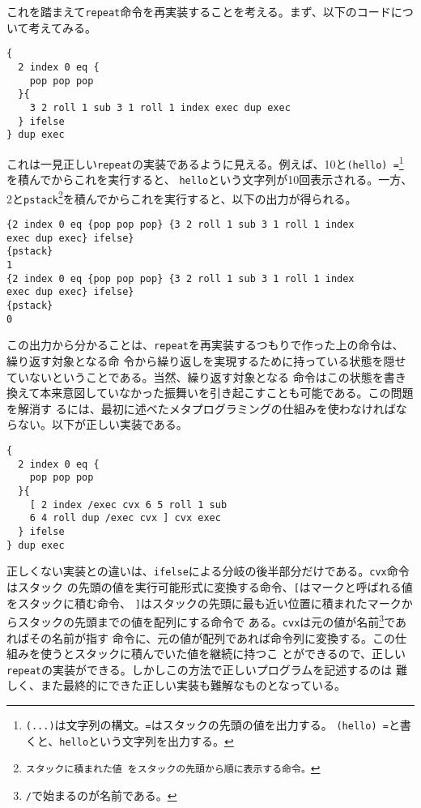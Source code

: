 \documentclass[a4paper, 10pt, twocolumn, titlepage]{ujarticle}
\renewcommand{\{}{\symbol{"7B}}
\renewcommand{\}}{\symbol{"7D}}
\begin{document}
これを踏まえて\texttt{repeat}命令を再実装することを考える。まず、以下のコードについて考えてみる。

\begin{lstlisting}[style=plain]
{
  2 index 0 eq {
    pop pop pop
  }{
    3 2 roll 1 sub 3 1 roll 1 index exec dup exec
  } ifelse
} dup exec
\end{lstlisting}

これは一見正しい\texttt{repeat}の実装であるように見える。例えば、10と\texttt{\{(hello)
=\}}\footnote{\texttt{(...)}は文字列の構文。\texttt{=}はスタックの先頭の値を出力する。
\texttt{(hello) =}と書くと、\texttt{hello}という文字列を出力する。}を積んでからこれを実行すると、
\texttt{hello}という文字列が10回表示される。一方、2と\texttt{\{pstack\footnote{スタックに積まれた値
をスタックの先頭から順に表示する命令。}\}}を積んでからこれを実行すると、以下の出力が得られる。

\begin{lstlisting}[style=plain]
{2 index 0 eq {pop pop pop} {3 2 roll 1 sub 3 1 roll 1 index
exec dup exec} ifelse}
{pstack}
1
{2 index 0 eq {pop pop pop} {3 2 roll 1 sub 3 1 roll 1 index
exec dup exec} ifelse}
{pstack}
0
\end{lstlisting}

この出力から分かることは、\texttt{repeat}を再実装するつもりで作った上の命令は、繰り返す対象となる命
令から繰り返しを実現するために持っている状態を隠せていないということである。当然、繰り返す対象となる
命令はこの状態を書き換えて本来意図していなかった振舞いを引き起こすことも可能である。この問題を解消す
るには、最初に述べたメタプログラミングの仕組みを使わなければならない。以下が正しい実装である。

\begin{lstlisting}[style=plain]
{
  2 index 0 eq {
    pop pop pop
  }{
    [ 2 index /exec cvx 6 5 roll 1 sub
    6 4 roll dup /exec cvx ] cvx exec
  } ifelse
} dup exec
\end{lstlisting}

正しくない実装との違いは、\texttt{ifelse}による分岐の後半部分だけである。\texttt{cvx}命令はスタック
の先頭の値を実行可能形式に変換する命令、\texttt{[}はマークと呼ばれる値をスタックに積む命令、
\texttt{]}はスタックの先頭に最も近い位置に積まれたマークからスタックの先頭までの値を配列にする命令で
ある。\texttt{cvx}は元の値が名前\footnote{\texttt{/}で始まるのが名前である。}であればその名前が指す
命令に、元の値が配列であれば命令列に変換する。この仕組みを使うとスタックに積んでいた値を継続に持つこ
とができるので、正しい\texttt{repeat}の実装ができる。しかしこの方法で正しいプログラムを記述するのは
難しく、また最終的にできた正しい実装も難解なものとなっている。
\end{document}
